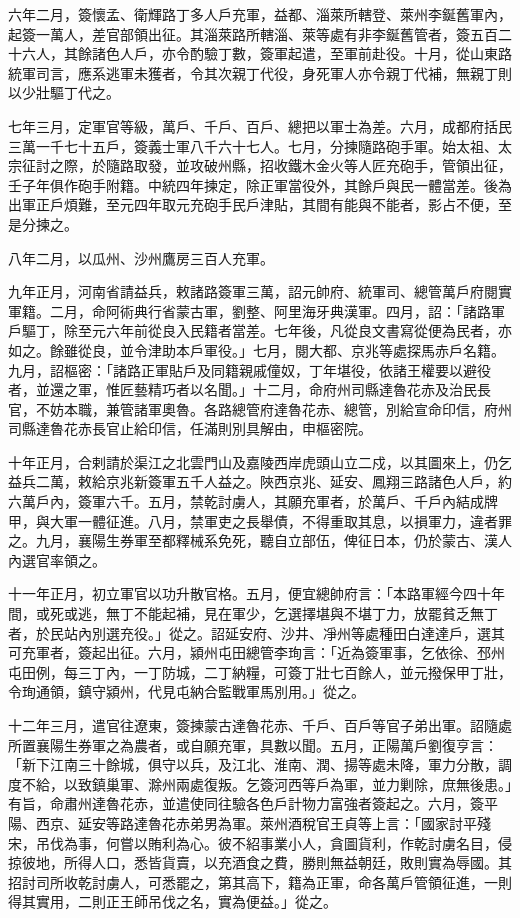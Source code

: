 \begin{pinyinscope}
 六年二月，簽懷孟、衛輝路丁多人戶充軍，益都、淄萊所轄登、萊州李鋋舊軍內，起簽一萬人，差官部領出征。其淄萊路所轄淄、萊等處有非李鋋舊管者，簽五百二十六人，其餘諸色人戶，亦令酌驗丁數，簽軍起遣，至軍前赴役。十月，從山東路統軍司言，應系逃軍未獲者，令其次親丁代役，身死軍人亦令親丁代補，無親丁則以少壯驅丁代之。



 七年三月，定軍官等級，萬戶、千戶、百戶、總把以軍士為差。六月，成都府括民三萬一千七十五戶，簽義士軍八千六十七人。七月，分揀隨路砲手軍。始太祖、太宗征討之際，於隨路取發，並攻破州縣，招收鐵木金火等人匠充砲手，管領出征，壬子年俱作砲手附籍。中統四年揀定，除正軍當役外，其餘戶與民一體當差。後為出軍正戶煩難，至元四年取元充砲手民戶津貼，其間有能與不能者，影占不便，至是分揀之。



 八年二月，以瓜州、沙州鷹房三百人充軍。



 九年正月，河南省請益兵，敕諸路簽軍三萬，詔元帥府、統軍司、總管萬戶府閱實軍籍。二月，命阿術典行省蒙古軍，劉整、阿里海牙典漢軍。四月，詔：「諸路軍戶驅丁，除至元六年前從良入民籍者當差。七年後，凡從良文書寫從便為民者，亦如之。餘雖從良，並令津助本戶軍役。」七月，閱大都、京兆等處探馬赤戶名籍。九月，詔樞密：「諸路正軍貼戶及同籍親戚僮奴，丁年堪役，依諸王權要以避役者，並還之軍，惟匠藝精巧者以名聞。」十二月，命府州司縣達魯花赤及治民長官，不妨本職，兼管諸軍奧魯。各路總管府達魯花赤、總管，別給宣命印信，府州司縣達魯花赤長官止給印信，任滿則別具解由，申樞密院。



 十年正月，合剌請於渠江之北雲門山及嘉陵西岸虎頭山立二戍，以其圖來上，仍乞益兵二萬，敕給京兆新簽軍五千人益之。陜西京兆、延安、鳳翔三路諸色人戶，約六萬戶內，簽軍六千。五月，禁乾討虜人，其願充軍者，於萬戶、千戶內結成牌甲，與大軍一體征進。八月，禁軍吏之長舉債，不得重取其息，以損軍力，違者罪之。九月，襄陽生券軍至都釋械系免死，聽自立部伍，俾征日本，仍於蒙古、漢人內選官率領之。



 十一年正月，初立軍官以功升散官格。五月，便宜總帥府言：「本路軍經今四十年間，或死或逃，無丁不能起補，見在軍少，乞選擇堪與不堪丁力，放罷貧乏無丁者，於民站內別選充役。」從之。詔延安府、沙井、凈州等處種田白達達戶，選其可充軍者，簽起出征。六月，潁州屯田總管李珣言：「近為簽軍事，乞依徐、邳州屯田例，每三丁內，一丁防城，二丁納糧，可簽丁壯七百餘人，並元撥保甲丁壯，令珣通領，鎮守潁州，代見屯納合監戰軍馬別用。」從之。



 十二年三月，遣官往遼東，簽揀蒙古達魯花赤、千戶、百戶等官子弟出軍。詔隨處所置襄陽生券軍之為農者，或自願充軍，具數以聞。五月，正陽萬戶劉復亨言：「新下江南三十餘城，俱守以兵，及江北、淮南、潤、揚等處未降，軍力分散，調度不給，以致鎮巢軍、滁州兩處復叛。乞簽河西等戶為軍，並力剿除，庶無後患。」有旨，命肅州達魯花赤，並遣使同往驗各色戶計物力富強者簽起之。六月，簽平陽、西京、延安等路達魯花赤弟男為軍。萊州酒稅官王貞等上言：「國家討平殘宋，吊伐為事，何嘗以賄利為心。彼不紹事業小人，貪圖貨利，作乾討虜名目，侵掠彼地，所得人口，悉皆貨賣，以充酒食之費，勝則無益朝廷，敗則實為辱國。其招討司所收乾討虜人，可悉罷之，第其高下，籍為正軍，命各萬戶管領征進，一則得其實用，二則正王師吊伐之名，實為便益。」從之。




\end{pinyinscope}
